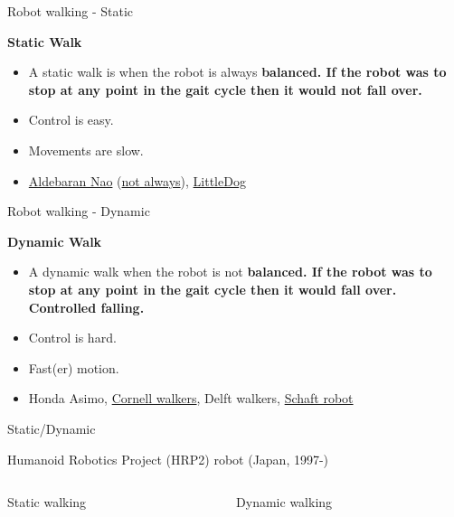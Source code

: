 \documentclass[compress]{beamer}
\begin{document}
\begin{frame}{Robot walking - Static}

    \textbf{Static Walk}

    \begin{itemize}

        \item A static walk is when the robot is always \textbf{balanced. If the
            robot was to stop at any point in the gait cycle then it would not
            fall over.}
        \item Control is easy.
        \item Movements are slow.
        \item \href{http://www.youtube.com/watch?v=NbnELOZbsls\&feature=related}{Aldebaran
            Nao} (\href{http://www.youtube.com/watch?v=3aOuQ1_e--k}{not always}),
            \href{http://www.youtube.com/watch?v=cYo9Whssla8}{LittleDog}
    \end{itemize}

\end{frame}

\begin{frame}{Robot walking - Dynamic}

    \textbf{Dynamic Walk}

    \begin{itemize}

        \item A dynamic walk when the robot is not \textbf{balanced. If the robot
            was to stop at any point in the gait cycle then it would fall over.
            Controlled falling.}
        \item Control is hard.
        \item Fast(er) motion.
        \item Honda Asimo, \href{http://www.youtube.com/watch?v=KLepY1AsaRk}{Cornell
            walkers}, Delft walkers,
            \href{http://www.youtube.com/watch?v=diaZFIUBMBQ}{Schaft robot}
    \end{itemize}

\end{frame}

\begin{frame}{Static/Dynamic}

    Humanoid Robotics Project (HRP2) robot (Japan, 1997-)

    \begin{columns}
        \begin{column}{0.5\linewidth}
    Static walking

            
        \end{column}
        \begin{column}{0.5\linewidth}
    Dynamic walking

        \end{column}
    \end{columns}



\end{frame}
\end{document}
